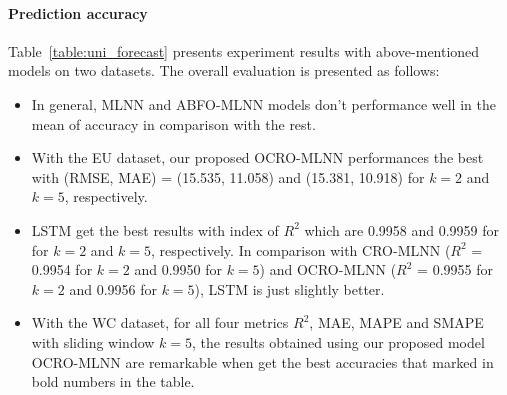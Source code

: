 \documentclass[review,3p,authoryear]{elsarticle}
\begin{document}
\paragraph{\textbf{Prediction accuracy}} 
Table~\ref{table:uni_forecast} presents experiment results with above-mentioned models on two datasets. The overall evaluation is presented as follows:
\begin{itemize}
	\item In general, MLNN and ABFO-MLNN models don't performance well in the mean of accuracy in comparison with the rest. 
	
	\item With the EU dataset, our proposed OCRO-MLNN performances the best with (RMSE, MAE) = (15.535, 11.058) and (15.381, 10.918) for $k = 2$ and $k = 5$, respectively. 
	
	\item LSTM get the best results with index of $R^{2}$ which are 0.9958 and 0.9959 for for $k = 2$ and $k = 5$, respectively. In comparison with CRO-MLNN ($R^{2}$ = 0.9954 for $k = 2$ and 0.9950 for $k = 5$) and OCRO-MLNN ($R^2$ = 0.9955 for $k = 2$ and 0.9956 for $k = 5$), LSTM is just slightly better. 
	
	\item With the WC dataset, for all four metrics $R^2$, MAE, MAPE and SMAPE with sliding window $k = 5$, the results obtained using our proposed model OCRO-MLNN are remarkable when get the best accuracies that marked in bold numbers in the table. 
	
\end{itemize}


\end{document}
